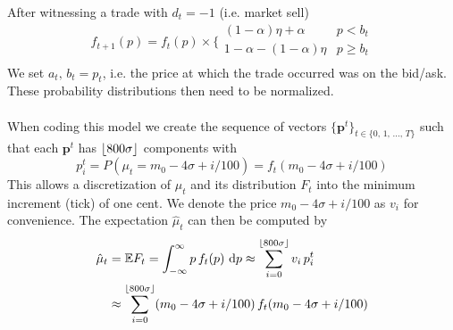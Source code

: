\documentclass[11pt]{report}
\DeclarePairedDelimiter\floor{\lfloor}{\rfloor}
\begin{document}
    After witnessing a trade with $d_t = -1$ (i.e. market sell)
    \[
    f_{t+1}(p) = f_t(p) \times
    \bigg\{\begin{array}{cc}
        (1 - \alpha)\eta + \alpha & p < b_t \\
        1 - \alpha - (1 - \alpha)\eta & p \geq b_t \\
    \end{array} 
    \]    
    We set $a_t,\,b_t = p_t$, i.e. the price at which the trade occurred was on the bid/ask. 
    These probability distributions then need to be normalized.\\\\
    When coding this model we create the sequence of vectors 
    $\{\mathbf{p}^t\}_{t \in \{0,\,1,\,...,\,T\}}$ such that each $\mathbf{p}^t$ has
    $\floor{800\sigma}$ components with
    \[
    p_i^t = P(\mu_t = m_0 - 4\sigma + i/100) = f_t(m_0 - 4\sigma + i/100)
    \]
    This allows a discretization of $\mu_t$ and its distribution $F_t$ into 
    the minimum increment (tick) of one cent. We denote the price $m_0 - 4\sigma + i/100$ 
    as $v_i$ for convenience. The expectation $\hat{\mu}_t$ can then be computed by
    \begin{align*}
    \hat{\mu}_t & = \mathbb{E}F_t = \int_{-\infty}^{\infty} p\,f_t(p) \,\,\mathrm{d}p
    \approx \sum_{i=0}^{\floor{800\sigma}} v_i\,p_i^t \\
    & \approx \sum_{i=0}^{\floor{800\sigma}} (m_0 - 4\sigma + i/100)\,f_t(m_0 - 4\sigma + i/100)
    \end{align*}
\end{document}
